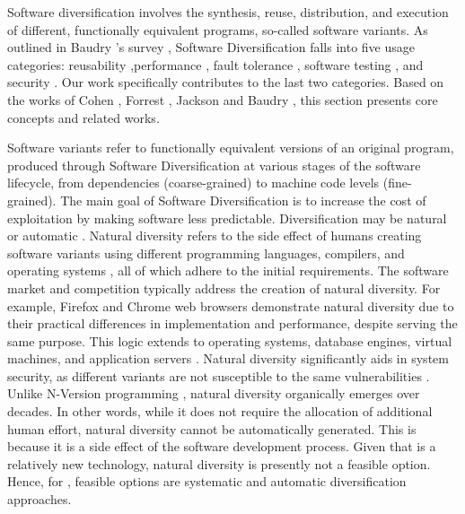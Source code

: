 

\label{sota:sw}

Software diversification involves the synthesis, reuse, distribution, and execution of different, functionally equivalent programs, so-called software variants. 
As outlined in Baudry \etal's survey \cite{natural_diversity}, Software Diversification falls into five usage categories: reusability \cite{pohl2005software},performance \cite{10.1145/2025113.2025133}, fault tolerance \cite{1659219}, software testing \cite{Chen2010AdaptiveRT}, and security \cite{cohen1993operating}. 
Our work specifically contributes to the last two categories.
Based on the works of Cohen \etal \cite{cohen1993operating}, Forrest \etal \cite{595185}, Jackson \etal \cite{jackson} and Baudry \etal \cite{natural_diversity}, this section presents core concepts and related works. 



Software variants refer to functionally equivalent versions of an original program, produced through Software Diversification at various stages of the software lifecycle, from dependencies (coarse-grained) to machine code levels (fine-grained).
The main goal of Software Diversification is to increase the cost of exploitation by making software less predictable. 
Diversification may be natural \cite{natural_diversity} or automatic \cite{offensive_div}. 
Natural diversity refers to the side effect of humans creating software variants using different programming languages, compilers, and operating systems \cite{natural_diversity}, all of which adhere to the initial requirements. 
The software market and competition typically address the creation of natural diversity. 
For example, Firefox and Chrome web browsers demonstrate natural diversity due to their practical differences in implementation and performance, despite serving the same purpose. 
This logic extends to operating systems, database engines, virtual machines, and application servers \cite{natural_diversity}. 
Natural diversity significantly aids in system security, as different variants are not susceptible to the same vulnerabilities \cite{781031, 10.5555/1009382.1009753}. 
Unlike N-Version programming \cite{6312924}, natural diversity organically emerges over decades. 
In other words, while it does not require the allocation of additional human effort, natural diversity cannot be automatically generated. 
This is because it is a side effect of the software development process.
Given that \Wasm is a relatively new technology, natural diversity is presently not a feasible option. 
Hence, for \Wasm, feasible options are systematic and automatic diversification approaches.



